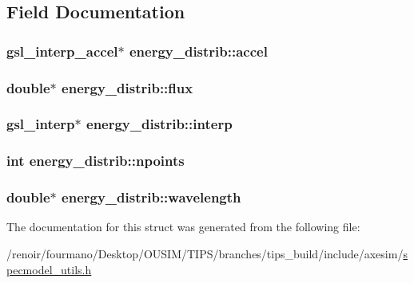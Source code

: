 \subsection{Field Documentation}
\hypertarget{structenergy__distrib_a7d0d556a145bd34158514bdbab57b0ee}{
\subsubsection[{accel}]{\setlength{\rightskip}{0pt plus 5cm}gsl\_\-interp\_\-accel$\ast$ {\bf energy\_\-distrib::accel}}}
\label{structenergy__distrib_a7d0d556a145bd34158514bdbab57b0ee}
\hypertarget{structenergy__distrib_a7da8059a7bb2f8af463b6ee1dd1e6554}{
\subsubsection[{flux}]{\setlength{\rightskip}{0pt plus 5cm}double$\ast$ {\bf energy\_\-distrib::flux}}}
\label{structenergy__distrib_a7da8059a7bb2f8af463b6ee1dd1e6554}
\hypertarget{structenergy__distrib_a3d90efb6bd5ace3c19884613063644af}{
\subsubsection[{interp}]{\setlength{\rightskip}{0pt plus 5cm}gsl\_\-interp$\ast$ {\bf energy\_\-distrib::interp}}}
\label{structenergy__distrib_a3d90efb6bd5ace3c19884613063644af}
\hypertarget{structenergy__distrib_ae5e24fde4a41b46a8b8510118f646e67}{
\subsubsection[{npoints}]{\setlength{\rightskip}{0pt plus 5cm}int {\bf energy\_\-distrib::npoints}}}
\label{structenergy__distrib_ae5e24fde4a41b46a8b8510118f646e67}
\hypertarget{structenergy__distrib_ac32d12647e9ef7f158b0d4532c09a568}{
\subsubsection[{wavelength}]{\setlength{\rightskip}{0pt plus 5cm}double$\ast$ {\bf energy\_\-distrib::wavelength}}}
\label{structenergy__distrib_ac32d12647e9ef7f158b0d4532c09a568}


The documentation for this struct was generated from the following file:\begin{DoxyCompactItemize}
\item 
/renoir/fourmano/Desktop/OUSIM/TIPS/branches/tips\_\-build/include/axesim/\hyperlink{specmodel__utils_8h}{specmodel\_\-utils.h}\end{DoxyCompactItemize}
